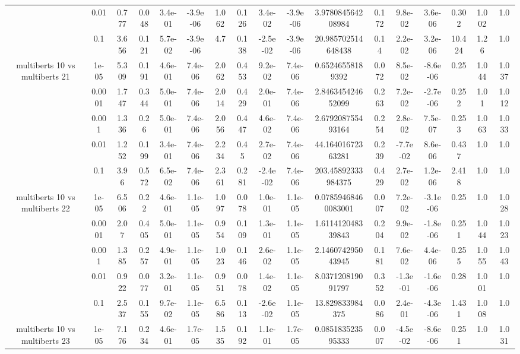 \begin{tabular}{|c|c|c|c|c|c|c|c|c|c|c|c|c|c|c|c|c|}
 & 0.01 & 0.777 & 0.048 & 3.4e-01 & -3.9e-06 & 1.062 & 0.126 & 3.4e-02 & -3.9e-06 & 3.978084564208984 & 0.172 & 9.8e-02 & 3.6e-06 & 0.302 & 1.002 & 1.0 \\
 & 0.1 & 3.656 & 0.121 & 5.7e-02 & -3.9e-06 & 4.7 & 0.138 & -2.5e-02 & -3.9e-06 & 20.985702514648438 & 0.14 & 2.2e-02 & 3.2e-06 & 10.424 & 1.26 & 1.0 \\
\hline
\multirow{5}{*}{multiberts 10 vs multiberts 21} & 1e-05 & 5.309 & 0.191 & 4.6e-01 & 7.4e-06 & 2.062 & 0.453 & 9.2e-02 & 7.4e-06 & 0.65246558189392 & 0.072 & 8.5e-02 & -8.6e-06 & 0.25 & 1.044 & 1.037 \\
 & 0.0001 & 1.747 & 0.344 & 5.0e-01 & 7.4e-06 & 2.014 & 0.429 & 2.0e-01 & 7.4e-06 & 2.846345424652099 & 0.263 & 7.2e-02 & -2.7e-06 & 0.252 & 1.01 & 1.012 \\
 & 0.001 & 1.336 & 0.26 & 5.0e-01 & 7.4e-06 & 2.056 & 0.447 & 4.6e-02 & 7.4e-06 & 2.679208755493164 & 0.254 & 2.8e-02 & 7.5e-07 & 0.253 & 1.063 & 1.033 \\
 & 0.01 & 1.252 & 0.199 & 3.4e-01 & 7.4e-06 & 2.234 & 0.45 & 2.7e-02 & 7.4e-06 & 44.16401672363281 & 0.239 & -7.7e-02 & 8.6e-06 & 0.437 & 1.0 & 1.0 \\
 & 0.1 & 3.96 & 0.572 & 6.5e-02 & 7.4e-06 & 2.361 & 0.281 & -2.4e-02 & 7.4e-06 & 203.45892333984375 & 0.429 & 2.7e-02 & 1.2e-06 & 2.418 & 1.0 & 1.0 \\
\hline
\multirow{5}{*}{multiberts 10 vs multiberts 22} & 1e-05 & 6.506 & 0.22 & 4.6e-01 & 1.1e-05 & 1.097 & 0.078 & 1.0e-01 & 1.1e-05 & 0.07859468460083001 & 0.007 & 7.2e-02 & -3.1e-06 & 0.25 & 1.0 & 1.028 \\
 & 0.0001 & 2.07 & 0.405 & 5.0e-01 & 1.1e-05 & 0.954 & 0.109 & 1.3e-01 & 1.1e-05 & 1.611412048339843 & 0.204 & 9.9e-02 & -1.8e-06 & 0.251 & 1.044 & 1.023 \\
 & 0.001 & 1.385 & 0.257 & 4.9e-01 & 1.1e-05 & 1.023 & 0.146 & 2.6e-02 & 1.1e-05 & 2.146074295043945 & 0.181 & 7.6e-02 & 4.4e-06 & 0.255 & 1.055 & 1.043 \\
 & 0.01 & 0.922 & 0.077 & 3.2e-01 & 1.1e-05 & 0.951 & 0.078 & 1.4e-02 & 1.1e-05 & 8.037120819091797 & 0.352 & -1.3e-01 & -1.6e-06 & 0.28 & 1.001 & 1.0 \\
 & 0.1 & 2.537 & 0.155 & 9.7e-02 & 1.1e-05 & 6.586 & 0.113 & -2.6e-02 & 1.1e-05 & 13.829833984375 & 0.086 & 2.4e-01 & -4.3e-06 & 1.431 & 1.008 & 1.0 \\
\hline
\multirow{5}{*}{multiberts 10 vs multiberts 23} & 1e-05 & 7.176 & 0.234 & 4.6e-01 & 1.7e-05 & 1.535 & 0.192 & 1.1e-01 & 1.7e-05 & 0.085183523595333 & 0.007 & -4.5e-02 & -8.6e-06 & 0.251 & 1.0 & 1.031 \\

\end{tabular}
